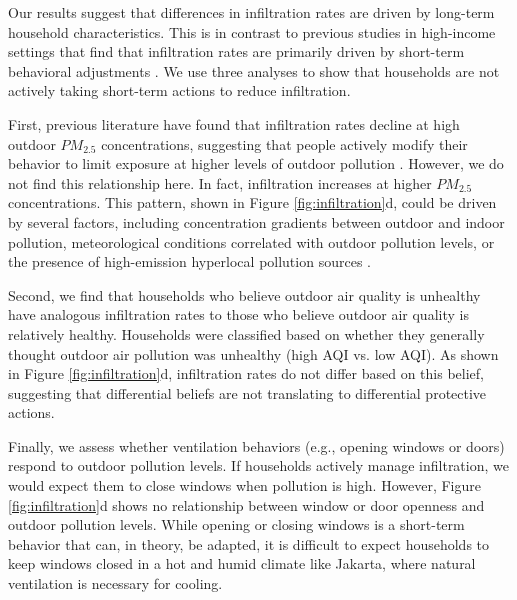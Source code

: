 \documentclass[reqno,12pt,notitlepage]{article}
\begin{document}
Our results suggest that differences in infiltration rates are driven by long-term household characteristics. This is in contrast to previous studies in high-income settings that find that infiltration rates are primarily driven by short-term behavioral adjustments \citep{burke_exposures_2022, baquie_know_2024}. We use three analyses to show that  households are not actively taking short-term actions to reduce infiltration.

First, previous literature have found that infiltration rates decline at high outdoor $PM_{2.5}$ concentrations, suggesting that people actively modify their behavior to limit exposure at higher levels of outdoor pollution \citep{burke_exposures_2022,lunderberg_assessing_2023}. However, we do not find this relationship here. In fact, infiltration increases at higher $PM_{2.5}$ concentrations. This pattern, shown in Figure \ref{fig:infiltration}d, could be driven by several factors, including concentration gradients between outdoor and indoor pollution, meteorological conditions correlated with outdoor pollution levels, or the presence of high-emission hyperlocal pollution sources \citep{lunderberg_assessing_2023,macneill_factors_2012}.

Second, we find that households who believe outdoor air quality is unhealthy have analogous infiltration rates to those who believe outdoor air quality is relatively healthy. Households were classified based on whether they generally thought outdoor air pollution was unhealthy (high AQI vs. low AQI). As shown in Figure \ref{fig:infiltration}d, infiltration rates do not differ based on this belief, suggesting that differential beliefs are not translating to differential protective actions.  

Finally, we assess whether ventilation behaviors (e.g., opening windows or doors) respond to outdoor pollution levels. If households actively manage infiltration, we would expect them to close windows when pollution is high. However, Figure \ref{fig:infiltration}d shows no relationship between window or door openness and outdoor pollution levels. While opening or closing windows is a short-term behavior that can, in theory, be adapted, it is difficult to expect households to keep windows closed in a hot and humid climate like Jakarta, where natural ventilation is necessary for cooling. 
\end{document}
